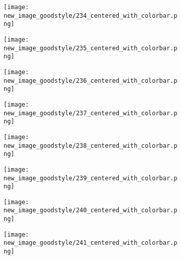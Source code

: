 \documentclass[a4paper,12pt]{article}
\begin{document}
\begin{figure}[H]
  \begin{subfigure}{0.11\textwidth}
    \texttt{[image: new\_image\_goodstyle/234\_centered\_with\_colorbar.png]}
  \end{subfigure}
  \hfill
  \begin{subfigure}{0.11\textwidth}
    \texttt{[image: new\_image\_goodstyle/235\_centered\_with\_colorbar.png]}
  \end{subfigure}
  \hfill
  \begin{subfigure}{0.11\textwidth}
    \texttt{[image: new\_image\_goodstyle/236\_centered\_with\_colorbar.png]}
  \end{subfigure}
  \hfill
  \begin{subfigure}{0.11\textwidth}
    \texttt{[image: new\_image\_goodstyle/237\_centered\_with\_colorbar.png]}
  \end{subfigure}
  \hfill
  \begin{subfigure}{0.11\textwidth}
    \texttt{[image: new\_image\_goodstyle/238\_centered\_with\_colorbar.png]}
  \end{subfigure}
  \hfill
  \begin{subfigure}{0.11\textwidth}
    \texttt{[image: new\_image\_goodstyle/239\_centered\_with\_colorbar.png]}
  \end{subfigure}
  \hfill
  \begin{subfigure}{0.11\textwidth}
    \texttt{[image: new\_image\_goodstyle/240\_centered\_with\_colorbar.png]}
  \end{subfigure}
  \hfill
  \begin{subfigure}{0.11\textwidth}
    \texttt{[image: new\_image\_goodstyle/241\_centered\_with\_colorbar.png]}
  \end{subfigure}
  \hfill
\end{figure}
\end{document}
